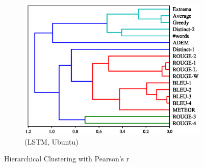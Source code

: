 \begin{figure}[htb]
\begin{subfigure}{0.40\linewidth}
        \includegraphics[width=\linewidth]{figure/plot/hierarchy/v2/pearson/lstm/ubuntu/plot.eps}
        \caption{(LSTM, Ubuntu)}
    \end{subfigure}
    \centering
    \caption{Hierarchical Clustering with Pearson's r}
    \label{fig:hierarchy}
\end{figure}
